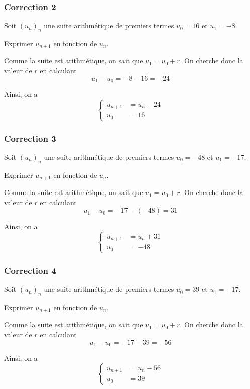 \documentclass[15pt, mathserif]{beamer}
\begin{document}
\begin{frame}
\vspace{-10mm}
	\frametitle{Correction 2}
Soit $(u_n)_n$ une suite arithmétique de premiers termes $u_0=16$ et $u_1=-8$. 
 
 Exprimer $u_{n+1}$ en fonction de $u_n$. 
 
 \vspace*{1cm} 
 
 Comme la suite est arithmétique, on sait que $u_1=u_0+r$. On cherche donc la valeur de $r$ en calculant $$u_1-u_0=-8-16=-24$$ 
 
 Ainsi, on a $$ \left\{ 
 \begin{array}{ll} 
 u_{n+1} &= u_n -24 \\ 
 u_0 & = 16 
 \end{array} 
 \right. $$ 
 \end{frame}


\begin{frame}
\vspace{-10mm}
	\frametitle{Correction 3}
Soit $(u_n)_n$ une suite arithmétique de premiers termes $u_0=-48$ et $u_1=-17$. 
 
 Exprimer $u_{n+1}$ en fonction de $u_n$. 
 
 \vspace*{1cm} 
 
 Comme la suite est arithmétique, on sait que $u_1=u_0+r$. On cherche donc la valeur de $r$ en calculant $$u_1-u_0=-17-\left(-48\right)=31$$ 
 
 Ainsi, on a $$ \left\{ 
 \begin{array}{ll} 
 u_{n+1} &= u_n +31 \\ 
 u_0 & = -48 
 \end{array} 
 \right. $$ 
 \end{frame}


\begin{frame}
\vspace{-10mm}
	\frametitle{Correction 4}
Soit $(u_n)_n$ une suite arithmétique de premiers termes $u_0=39$ et $u_1=-17$. 
 
 Exprimer $u_{n+1}$ en fonction de $u_n$. 
 
 \vspace*{1cm} 
 
 Comme la suite est arithmétique, on sait que $u_1=u_0+r$. On cherche donc la valeur de $r$ en calculant $$u_1-u_0=-17-39=-56$$ 
 
 Ainsi, on a $$ \left\{ 
 \begin{array}{ll} 
 u_{n+1} &= u_n -56 \\ 
 u_0 & = 39 
 \end{array} 
 \right. $$ 
 \end{frame}
\end{document}
